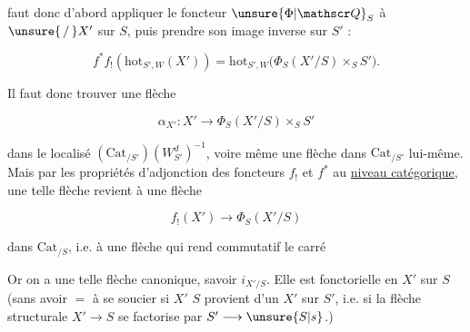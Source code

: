 
faut donc d'abord appliquer le foncteur $\unsure{\Phi|\mathscr Q}_S$ à $\unsure{\,/\,}X'$ sur $S$, puis prendre son image inverse sur $S'$ :

\[
f^*f_!(\mathrm{hot}_{S',W}(X'))=\mathrm{hot}_{S',W}\bigl(\Phi_S(X'/S)\times_S S'\bigr).
\]

Il faut donc trouver une flèche

\[
\alpha_{X'}: X'\longrightarrow \Phi_S(X'/S)\times_S S'
\]

dans le localisé $(\mathrm{Cat}_{/S'})(W^d_{S'})^{-1}$, voire même une flèche dans $\mathrm{Cat}_{/S'}$ lui-même. Mais par les propriétés d'adjonction des foncteurs $f_!$ et $f^*$ au \uline{niveau catégorique}, une telle flèche revient à une flèche

\[
f_!(X')\longrightarrow\Phi_S(X'/S)
\]

dans $\mathrm{Cat}_{/S}$, i.e. à une flèche qui rend commutatif le carré


Or on a une telle flèche canonique, savoir $i_{X'/S}$. Elle est fonctorielle en $X'$ sur $S$ (sans avoir $=$ à se soucier si $X'$  $S$ provient d'un $X'$ sur $S'$, i.e. si la flèche structurale $X'\longrightarrow S$ se factorise par $S'\longrightarrow\unsure{S|s}$.)
